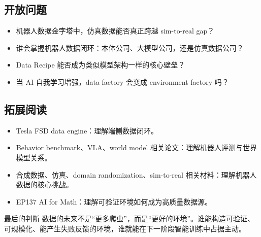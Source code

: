 \documentclass[a4paper]{article}
\begin{document}
\subsection{开放问题}

\begin{itemize}
\item 机器人数据金字塔中，仿真数据能否真正跨越 sim-to-real gap？
\item 谁会掌握机器人数据闭环：本体公司、大模型公司，还是仿真数据公司？
\item Data Recipe 能否成为类似模型架构一样的核心壁垒？
\item 当 AI 自我学习增强，data factory 会变成 environment factory 吗？
\end{itemize}

\subsection{拓展阅读}

\begin{itemize}
\item Tesla FSD data engine：理解端侧数据闭环。
\item Behavior benchmark、VLA、world model 相关论文：理解机器人评测与世界模型关系。
\item 合成数据、仿真、domain randomization、sim-to-real 相关材料：理解机器人数据的核心挑战。
\item EP137 AI for Math：理解可验证环境如何成为高质量数据源。
\end{itemize}

\begin{importantbox}{最后的判断}
数据的未来不是“更多爬虫”，而是“更好的环境”。谁能构造可验证、可规模化、能产生失败反馈的环境，谁就能在下一阶段智能训练中占据主动。
\end{importantbox}
\end{document}
